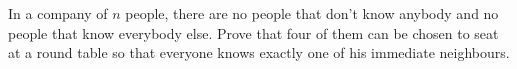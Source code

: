 \problem
In a company of $n$ people, there are no people that don't know anybody and
no people that know everybody else.
Prove that four of them can be chosen to seat at a round table so that everyone
knows exactly one of his immediate neighbours.
\solution
\endproblem
